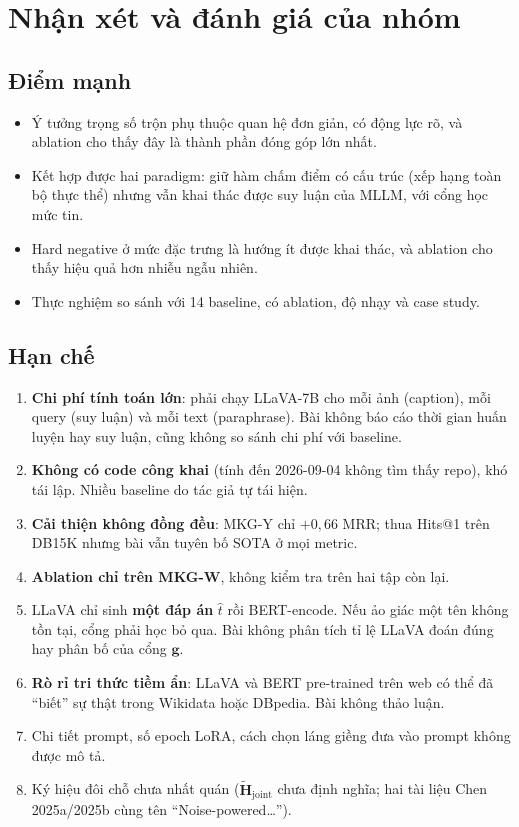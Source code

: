 \documentclass[11pt,a4paper]{article}
\newcommand{\Hjt}{\tilde{\mathbf{H}}_{\mathrm{joint}}}
\begin{document}
\section{Nhận xét và đánh giá của nhóm}

\subsection{Điểm mạnh}

\begin{itemize}
\item Ý tưởng trọng số trộn phụ thuộc quan hệ đơn giản, có động lực rõ, và ablation cho thấy đây là thành phần đóng góp lớn nhất.
\item Kết hợp được hai paradigm: giữ hàm chấm điểm có cấu trúc (xếp hạng toàn bộ thực thể) nhưng vẫn khai thác được suy luận của MLLM, với cổng học mức tin.
\item Hard negative ở mức đặc trưng là hướng ít được khai thác, và ablation cho thấy hiệu quả hơn nhiễu ngẫu nhiên.
\item Thực nghiệm so sánh với 14 baseline, có ablation, độ nhạy và case study.
\end{itemize}

\subsection{Hạn chế}

\begin{enumerate}
\item \textbf{Chi phí tính toán lớn}: phải chạy LLaVA-7B cho mỗi ảnh (caption), mỗi query (suy luận) và mỗi text (paraphrase). Bài không báo cáo thời gian huấn luyện hay suy luận, cũng không so sánh chi phí với baseline.
\item \textbf{Không có code công khai} (tính đến 2026-09-04 không tìm thấy repo), khó tái lập. Nhiều baseline do tác giả tự tái hiện.
\item \textbf{Cải thiện không đồng đều}: MKG-Y chỉ $+0{,}66$ MRR; thua Hits@1 trên DB15K nhưng bài vẫn tuyên bố SOTA ở mọi metric.
\item \textbf{Ablation chỉ trên MKG-W}, không kiểm tra trên hai tập còn lại.
\item LLaVA chỉ sinh \textbf{một đáp án} $\hat{t}$ rồi BERT-encode. Nếu ảo giác một tên không tồn tại, cổng phải học bỏ qua. Bài không phân tích tỉ lệ LLaVA đoán đúng hay phân bố của cổng $\mathbf{g}$.
\item \textbf{Rò rỉ tri thức tiềm ẩn}: LLaVA và BERT pre-trained trên web có thể đã ``biết'' sự thật trong Wikidata hoặc DBpedia. Bài không thảo luận.
\item Chi tiết prompt, số epoch LoRA, cách chọn láng giềng đưa vào prompt không được mô tả.
\item Ký hiệu đôi chỗ chưa nhất quán ($\Hjt$ chưa định nghĩa; hai tài liệu Chen 2025a/2025b cùng tên ``Noise-powered\ldots'').
\end{enumerate}
\end{document}
